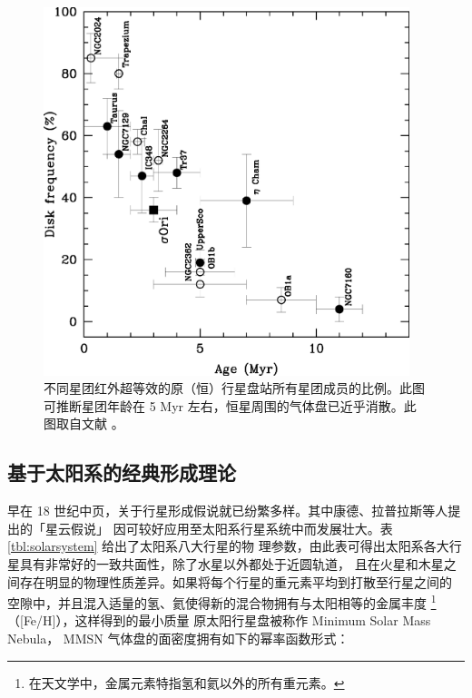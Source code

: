 \begin{figure}[t]
\centering
\includegraphics[width=0.95\textwidth]{figures/chapter1/fig10_pftimescale.eps}
\caption[不同星团红外超等效的原（恒）行星盘站所有星团成员的比例。此图可推断星团年龄老于10 Myr 后，恒星周围的气体盘已近乎完全消散。此图版权所有：Hern{\'a}ndez J. 等人。]{不同星团红外超等效的原（恒）行星盘站所有星团成员的比例。此图可推断星团年龄在 5 Myr 左右，恒星周围的气体盘已近乎消散。此图取自文献 。}
\label{fig:pftimescale}
\end{figure}

\subsection{基于太阳系的经典形成理论} \label{sec:clspftheory}

早在 18 世纪中页，关于行星形成假说就已纷繁多样。其中康德、拉普拉斯等人提出的「星云假说」
因可较好应用至太阳系行星系统中而发展壮大。表\ref{tbl:solarsystem} 给出了太阳系八大行星的物
理参数，由此表可得出太阳系各大行星具有非常好的一致共面性，除了水星以外都处于近圆轨道，
且在火星和木星之间存在明显的物理性质差异。如果将每个行星的重元素平均到打散至行星之间的
空隙中，并且混入适量的氢、氦使得新的混合物拥有与太阳相等的金属丰度
\footnote{在天文学中，金属元素特指氢和氦以外的所有重元素。}（[Fe/H]），这样得到的最小质量
原太阳行星盘被称作 Minimum Solar Mass Nebula\cite{Weidenschilling1977,Hayashi1981}，
MMSN 气体盘的面密度拥有如下的幂率函数形式：

